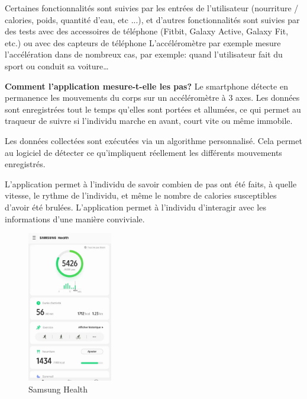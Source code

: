Certaines fonctionnalités sont suivies par les entrées de l'utilisateur (nourriture / calories, poids, quantité d'eau, etc ...), et d'autres fonctionnalités sont suivies par des tests avec des accessoires de téléphone (Fitbit, Galaxy Active, Galaxy Fit, etc.) ou avec des capteurs de téléphone L'accéléromètre par exemple mesure l'accélération  dans de nombreux cas, par exemple: quand l'utilisateur fait du sport ou conduit sa voiture…

\textbf{Comment l'application mesure-t-elle les pas?}
Le smartphone détecte en permanence les mouvements du corps sur un accéléromètre à 3 axes. Les données sont enregistrées tout le temps qu'elles sont portées et allumées, ce qui permet au traqueur de suivre si l'individu marche en avant, court vite ou même immobile.

Les données collectées sont exécutées via un algorithme personnalisé. Cela permet au logiciel de détecter ce qu'impliquent réellement les différents mouvements enregistrés.

L'application permet à l'individu de savoir combien de pas ont été faits, à quelle vitesse, le rythme de l'individu, et même le nombre de calories susceptibles d'avoir été brulées. L'application permet à l'individu d'interagir avec les informations d'une manière conviviale.

\begin{figure}[h!]
    \center
    \includegraphics[width=0.33\textwidth]{Images/chapter1/samsungHealth.png}
    \caption{Samsung Health}
    \label{fig:Application}
\end{figure}
